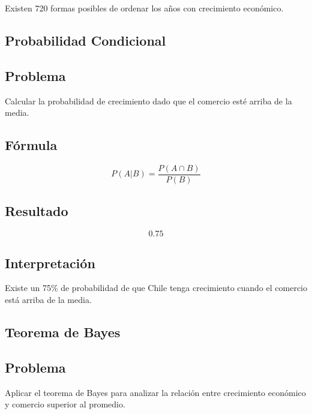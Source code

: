 \documentclass[12pt]{article}
\begin{document}
Existen 720 formas posibles de ordenar los años con crecimiento económico.


\subsection{Probabilidad Condicional}

\subsection*{Problema}

Calcular la probabilidad de crecimiento dado que el comercio esté arriba de la media.

\subsection*{Fórmula}

\[
P(A|B)=\frac{P(A\cap B)}{P(B)}
\]

\subsection*{Resultado}

\[
0.75
\]

\subsection*{Interpretación}

Existe un 75\% de probabilidad de que Chile tenga crecimiento cuando el comercio está arriba de la media.


\subsection{Teorema de Bayes}

\subsection*{Problema}

Aplicar el teorema de Bayes para analizar la relación entre crecimiento económico y comercio superior al promedio.
\end{document}
